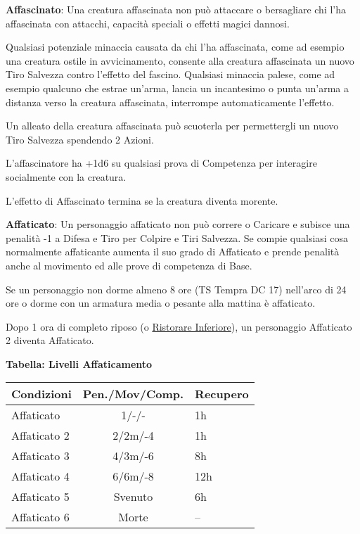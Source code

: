 \begin{multicols}{2}
\textbf{Affascinato}: Una creatura affascinata non può attaccare o bersagliare chi l'ha affascinata con attacchi, capacità speciali o effetti magici dannosi.

Qualsiasi potenziale minaccia causata da chi l'ha affascinata, come ad esempio una creatura ostile in avvicinamento, consente alla creatura affascinata un nuovo Tiro Salvezza contro l'effetto del fascino. Qualsiasi minaccia palese, come ad esempio qualcuno che estrae un'arma, lancia un incantesimo o punta un'arma a distanza verso la creatura affascinata, interrompe automaticamente l'effetto.

Un alleato della creatura affascinata può scuoterla per permettergli un nuovo Tiro Salvezza spendendo 2 Azioni.

L'affascinatore ha +1d6 su qualsiasi prova di Competenza per interagire socialmente con la creatura.

L'effetto di Affascinato termina se la creatura diventa morente.

\textbf{Affaticato}\hypertarget{affaticato}{}\label{affaticato}: Un personaggio affaticato non può correre o Caricare e subisce una penalità -1 a Difesa e Tiro per Colpire e Tiri Salvezza. Se compie qualsiasi cosa normalmente affaticante aumenta il suo grado di Affaticato e prende penalità anche al movimento ed alle prove di competenza di Base.

Se un personaggio non dorme almeno 8 ore (TS Tempra DC 17) nell'arco di 24 ore o dorme con un armatura media o pesante alla mattina è affaticato.

Dopo 1 ora di completo riposo (o \hyperlink{Ristorare Inferiore}{Ristorare Inferiore}), un personaggio Affaticato 2 diventa Affaticato. 

\medskip

\textbf{Tabella: Livelli Affaticamento}

\medskip

\begin{tabularx}{0.45\textwidth}{lcl}
\textbf{Condizioni}& \textbf{Pen./Mov/Comp.}&\textbf{Recupero}\\
\hline
Affaticato &1/-/-&1h\\
Affaticato 2&2/2m/-4&1h\\
Affaticato 3&4/3m/-6&8h\\
Affaticato 4&6/6m/-8&12h\\
Affaticato 5&Svenuto&6h\\
Affaticato 6&Morte&--
\end{tabularx}


\end{multicols}
